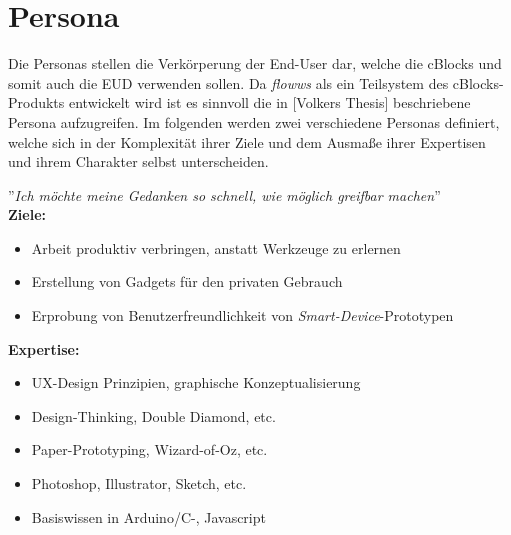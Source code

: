 \section{Persona}
Die Personas stellen die Verkörperung der End-User dar, welche die cBlocks und somit auch die \ac{EUD} verwenden sollen. Da \textit{flowws} als ein Teilsystem des cBlocks-Produkts entwickelt wird ist es sinnvoll die in [Volkers Thesis] beschriebene Persona aufzugreifen. Im folgenden werden zwei verschiedene Personas definiert, welche sich in der Komplexität ihrer Ziele und dem Ausmaße ihrer Expertisen und ihrem Charakter selbst unterscheiden.

\begin{tcolorbox}[title={Laura, 24, UX-Designerin},toptitle=3mm,bottomtitle=3mm, bicolor ,sidebyside,righthand width=3cm, sharp corners, boxrule=.4pt, colback=green!5, colbacklower=green!5]
    ''\textit{Ich möchte meine Gedanken so schnell, wie möglich greifbar machen}''
    \\
    \textbf{Ziele:} 
    
    \begin{itemize}
        \item Arbeit produktiv verbringen, anstatt Werkzeuge zu erlernen
        \item Erstellung von Gadgets für den privaten Gebrauch
        \item Erprobung von Benutzerfreundlichkeit von \textit{Smart-Device}-Prototypen
    \end{itemize}
    \textbf{Expertise:} 
    \begin{itemize}
        \item UX-Design Prinzipien, graphische Konzeptualisierung
        \item Design-Thinking, Double Diamond, etc.
        \item Paper-Prototyping, Wizard-of-Oz, etc.
        \item Photoshop, Illustrator, Sketch, etc.
        \item Basiswissen in Arduino/C-, Javascript
    \end{itemize}
    

\end{tcolorbox}
